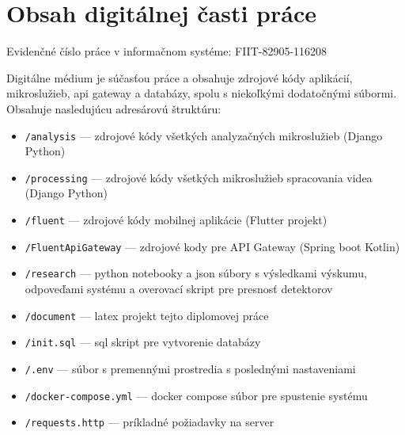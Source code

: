 \chapter{Obsah digitálnej časti práce \label{cha:cdrom} }

Evidenčné číslo práce v informačnom systéme: FIIT-82905-116208

Digitálne médium je súčasťou práce a obsahuje zdrojové kódy aplikácií, mikroslužieb, api gateway a databázy, spolu s niekoľkými dodatočnými súbormi.
Obsahuje nasledujúcu adresárovú štruktúru:

\begin{itemize}
\item \texttt{/analysis} --- zdrojové kódy všetkých analyzačných mikroslužieb (Django Python)
\item \texttt{/processing} --- zdrojové kódy všetkých mikroslužieb spracovania videa (Django Python)
\item \texttt{/fluent} --- zdrojové kódy mobilnej aplikácie (Flutter projekt)
\item \texttt{/FluentApiGateway} --- zdrojové kody pre API Gateway (Spring boot Kotlin)
\item \texttt{/research} --- python notebooky a json súbory s výsledkami výskumu, odpoveďami systému a overovací skript pre presnosť detektorov
\item \texttt{/document} --- latex projekt tejto diplomovej práce
\item \texttt{/init.sql} --- sql skript pre vytvorenie databázy
\item \texttt{/.env} --- súbor s premennými prostredia s poslednými nastaveniami
\item \texttt{/docker-compose.yml} --- docker compose súbor pre spustenie systému
\item \texttt{/requests.http} --- príkladné požiadavky na server
\end{itemize}
